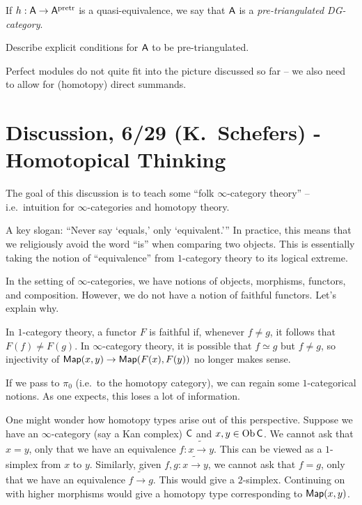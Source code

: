 \documentclass{amsart}
\begin{document}
\begin{dfn}
If $h: \mathsf{A} \to \mathsf{A}^{\mathrm{pretr}}$ is a quasi-equivalence, we say that $\mathsf{A}$ is a \emph{pre-triangulated DG-category}.
\end{dfn}

\begin{exer}
	Describe explicit conditions for $\mathsf{A}$ to be pre-triangulated.
\end{exer}

\begin{rmk}
	Perfect modules do not quite fit into the picture discussed so far -- we also need to allow for (homotopy) direct summands.
\end{rmk}

\section{Discussion, 6/29 (K.\ Schefers) - Homotopical Thinking}

The goal of this discussion is to teach some ``folk $\infty$-category theory'' -- i.e.\ intuition for $\infty$-categories and homotopy theory.

A key slogan: ``Never say `equals,' only `equivalent.'''
In practice, this means that we religiously avoid the word ``is'' when comparing two objects.
This is essentially taking the notion of ``equivalence'' from $1$-category theory to its logical extreme.

\begin{ex}
In the setting of $\infty$-categories, we have notions of objects, morphisms, functors, and composition.
However, we do not have a notion of faithful functors.
Let's explain why.

In $1$-category theory, a functor $F$ is faithful if, whenever $f \neq g$, it follows that $F(f) \neq F(g)$.
In $\infty$-category theory, it is possible that $f \simeq g$ but $f \neq g$, so injectivity of $\mathsf{Map}(x, y) \to \mathsf{Map}(F(x), F(y))$ no longer makes sense.
\end{ex}

If we pass to $\pi_0$ (i.e.\ to the homotopy category), we can regain some $1$-categorical notions.
As one expects, this loses a lot of information.

One might wonder how homotopy types arise out of this perspective.
Suppose we have an $\infty$-category (say a Kan complex) $\mathsf{C}$ and $x, y \in \operatorname{Ob} \mathsf{C}$.
We cannot ask that $x = y$, only that we have an equivalence $f: x \tilde{\rightarrow} y$.
This can be viewed as a $1$-simplex from $x$ to $y$.
Similarly, given $f, g: x \tilde{\rightarrow} y$, we cannot ask that $f = g$, only that we have an equivalence $f \tilde{\rightarrow} g$.
This would give a $2$-simplex.
Continuing on with higher morphisms would give a homotopy type corresponding to $\mathsf{Map}(x, y)$.
\end{document}
